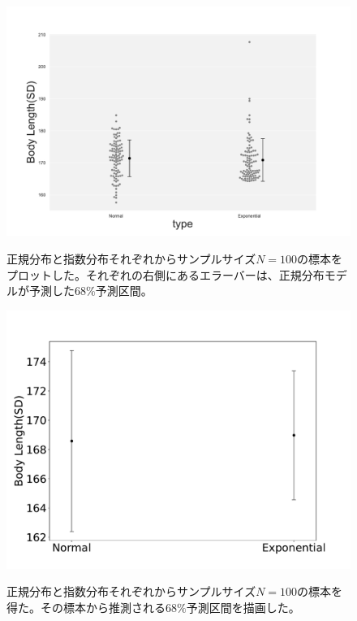 \begin{figure}
 \begin{center}
  \includegraphics[width=15cm]{./image/12_/sample_norm_expon.pdf}
  \label{fig:sample_norm_expon_model}
  \caption{正規分布と指数分布それぞれからサンプルサイズ$N=100$の標本をプロットした。それぞれの右側にあるエラーバーは、正規分布モデルが予測した$68\%$予測区間。}
 \end{center}
\end{figure}


\begin{figure}
 \begin{center}
  \includegraphics[width=15cm]{./image/12_/model_predict_SD.pdf}
  \label{fig:model_predict_SD}
  \caption{正規分布と指数分布それぞれからサンプルサイズ$N=100$の標本を得た。その標本から推測される$68\%$予測区間を描画した。}
 \end{center}
\end{figure}



